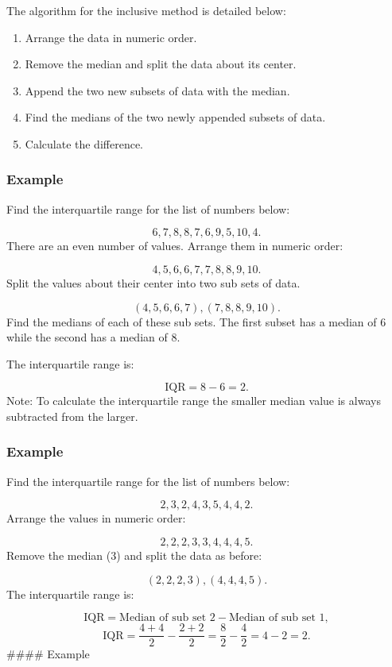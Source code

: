 \documentclass[
]{book}
\providecommand{\tightlist}{%
  \setlength{\itemsep}{0pt}\setlength{\parskip}{0pt}}
\begin{document}
The algorithm for the inclusive method is detailed below:

\begin{enumerate}
\def\labelenumi{\arabic{enumi}.}
\tightlist
\item
  Arrange the data in numeric order.
\item
  Remove the median and split the data about its center.
\item
  Append the two new subsets of data with the median.
\item
  Find the medians of the two newly appended subsets of data.
\item
  Calculate the difference.
\end{enumerate}

\hypertarget{example-8}{%
\subsubsection{Example}\label{example-8}}

Find the interquartile range for the list of numbers below:

\[6, 7, 8, 8, 7, 6, 9, 5, 10, 4. \]
There are an even number of values. Arrange them in numeric order:

\[ 4, 5, 6, 6, 7, 7, 8, 8, 9, 10.\]
Split the values about their center into two sub sets of data.

\[ (4, 5, 6, 6, 7), (7, 8, 8, 9, 10). \]
Find the medians of each of these sub sets. The first subset has a median of 6 while the second has a median of 8.

The interquartile range is:

\[ \textrm{IQR} = 8 - 6 = 2.\]
Note: To calculate the interquartile range the smaller median value is always subtracted from the larger.

\hypertarget{example-9}{%
\subsubsection{Example}\label{example-9}}

Find the interquartile range for the list of numbers below:

\[2, 3, 2, 4, 3, 5, 4, 4, 2.\]
Arrange the values in numeric order:

\[2, 2, 2, 3, 3, 4, 4, 4, 5. \]
Remove the median (3) and split the data as before:

\[ (2, 2, 2, 3), (4, 4, 4, 5).\]
The interquartile range is:

\[ \textrm{IQR}=\textrm{Median of sub set 2}- \textrm{Median of sub set 1},\]
\[ \textrm{IQR}=\frac{4+4}{2} - \frac{2+2}{2}=\frac{8}{2} - \frac{4}{2} = 4 - 2= 2.\]
\#\#\#\# Example
\end{document}
